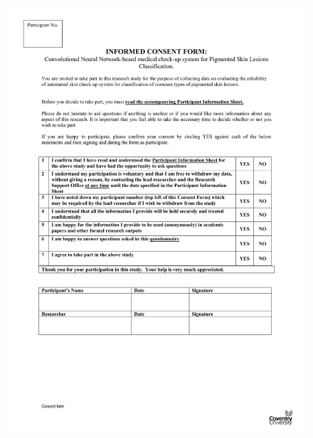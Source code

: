 \begin{figure}[!htp]
    \centering
    \includegraphics[width=\textwidth]{Documents/consent.pdf}
\end{figure}
\pagebreak
\thispagestyle{plain}

